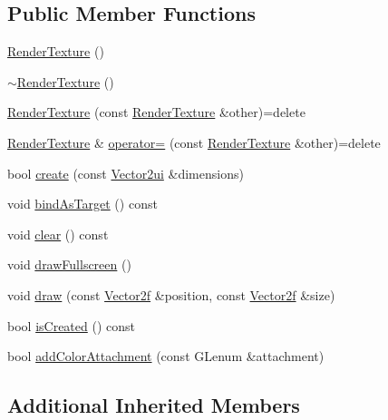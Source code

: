 \subsection*{Public Member Functions}
\begin{DoxyCompactItemize}
\item 
\hyperlink{classburn_1_1_render_texture_a45a90ff516418ff94aab80a662111bf2}{Render\-Texture} ()
\item 
\hyperlink{classburn_1_1_render_texture_aa4d4ccf9bc258394db5e3c9b17a8240a}{$\sim$\-Render\-Texture} ()
\item 
\hyperlink{classburn_1_1_render_texture_a88571931f632f9a48c2799158dda90c6}{Render\-Texture} (const \hyperlink{classburn_1_1_render_texture}{Render\-Texture} \&other)=delete
\item 
\hyperlink{classburn_1_1_render_texture}{Render\-Texture} \& \hyperlink{classburn_1_1_render_texture_acce2c388ed4850846da563480d2e549c}{operator=} (const \hyperlink{classburn_1_1_render_texture}{Render\-Texture} \&other)=delete
\item 
bool \hyperlink{classburn_1_1_render_texture_afb60cfbc42c0b3fc3543b3d2a954f7dd}{create} (const \hyperlink{namespaceburn_a6805fa33c49c4c3db88a7bebba2c408f}{Vector2ui} \&dimensions)
\item 
void \hyperlink{classburn_1_1_render_texture_a6eb38d6c2e0625a5a369f296598ce64a}{bind\-As\-Target} () const 
\item 
void \hyperlink{classburn_1_1_render_texture_a3316518369cf057633d22d06a6b1b6bb}{clear} () const 
\item 
void \hyperlink{classburn_1_1_render_texture_a80874c4d209be8823dbf9a2e116e6192}{draw\-Fullscreen} ()
\item 
void \hyperlink{classburn_1_1_render_texture_a2f482e794c0c46f56ce89656afe7cefc}{draw} (const \hyperlink{namespaceburn_af5ed9eb70cbf0fb572098ff43e146a0a}{Vector2f} \&position, const \hyperlink{namespaceburn_af5ed9eb70cbf0fb572098ff43e146a0a}{Vector2f} \&size)
\item 
bool \hyperlink{classburn_1_1_render_texture_ac4f8310b46a88a371213f519eb48aa4f}{is\-Created} () const 
\item 
bool \hyperlink{classburn_1_1_render_texture_ac290b3294c10d10628151dc06f15cbb7}{add\-Color\-Attachment} (const G\-Lenum \&attachment)
\end{DoxyCompactItemize}
\subsection*{Additional Inherited Members}


